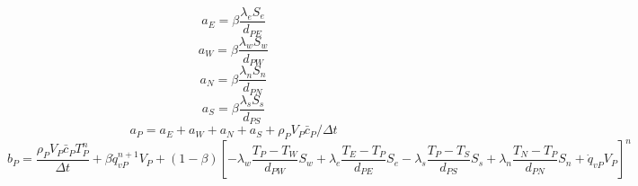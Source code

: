 \begin{equation}
a_{E}=\beta\frac{\lambda_{e}S_{e}}{d_{PE}}
\end{equation}
\begin{equation}
a_{W}=\beta\frac{\lambda_{w}S_{w}}{d_{PW}}
\end{equation}
\begin{equation}
a_{N}=\beta\frac{\lambda_{n}S_{n}}{d_{PN}}
\end{equation}
\begin{equation}
a_{S}=\beta\frac{\lambda_{s}S_{s}}{d_{PS}}
\end{equation}
\begin{equation}
a_{P}=a_{E}+a_{W}+a_{N}+a_{S}+\rho_{P}V_{P}\bar{c}_{P}/\Delta t
\end{equation}
\begin{equation}
b_{P}=\frac{\rho_{P}V_{P}\bar{c}_{P}T_{P}^{n}}{\Delta t}+\beta\dot{q}_{vP}^{n+1}V_{P}+\left(1-\beta\right)\left[-\lambda_{w}\frac{T_{P}-T_{W}}{d_{PW}}S_{w}+\lambda_{e}\frac{T_{E}-T_{P}}{d_{PE}}S_{e}-\lambda_{s}\frac{T_{P}-T_{S}}{d_{PS}}S_{s}+\lambda_{n}\frac{T_{N}-T_{P}}{d_{PN}}S_{n}+\dot{q}_{vP}V_{P}\right]^{n}
\end{equation}

